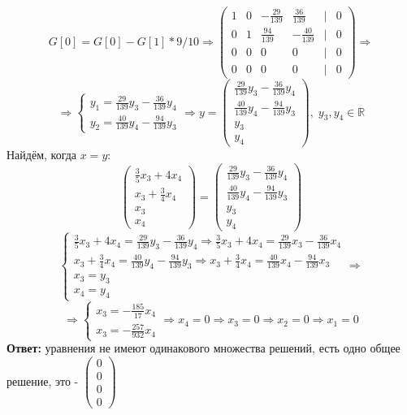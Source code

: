 \documentclass[a4paper]{article}
\newcommand{\mat}[1]{\begin{pmatrix} #1 \end{pmatrix}}
\renewcommand{\f}[2]{\frac{#1}{#2}}
\newcommand{\case}[1]{\begin{cases} #1 \end{cases}}
\renewcommand{\r}{\Rightarrow}
\newcommand{\RR}{\mathbb{R}}
\begin{document}
\begin{enumerate}
    $$G[0] = G[0]-G[1]*9/10 \r \mat{1 & 0 & -\frac{29}{139} & \frac{36}{139} & | & 0 \\ 0 & 1 & \frac{94}{139} & -\frac{40}{139} & | & 0 \\ 0 & 0 & 0 & 0 & | & 0 \\ 0 & 0 & 0 & 0 & | & 0}\r$$
    $$\r \case{y_1 = \frac{29}{139}y_3 -\frac{36}{139}y_4 \\ y_2 = \frac{40}{139}y_4-\frac{94}{139}y_3} \r y = \mat{\frac{29}{139}y_3 -\frac{36}{139}y_4 \\ \frac{40}{139}y_4-\frac{94}{139}y_3 \\ y_3 \\ y_4}, \; y_3, y_4 \in \RR$$
    Найдём, когда $x=y$:
    $$\mat{\f{3}{5}x_3 + 4x_4 \\ x_3+\f{3}{4}x_4 \\ x_3 \\ x_4} = \mat{\frac{29}{139}y_3 -\frac{36}{139}y_4 \\ \frac{40}{139}y_4-\frac{94}{139}y_3 \\ y_3 \\ y_4}$$
    $$\case{
        \f{3}{5}x_3 + 4x_4 = \frac{29}{139}y_3 -\frac{36}{139}y_4 \r \f{3}{5}x_3 + 4x_4 = \frac{29}{139}x_3 -\frac{36}{139}x_4\\ 
        x_3+\f{3}{4}x_4 = \frac{40}{139}y_4-\frac{94}{139}y_3 \r x_3+\f{3}{4}x_4 = \frac{40}{139}x_4-\frac{94}{139}x_3\\
        x_3 = y_3\\
        x_4 = y_4
    } \r$$
    $$\r \case{
        x_3 = -\f{185}{17}x_4\\
        x_3 = -\f{257}{932}x_4
    }\r x_4 = 0 \r x_3 = 0 \r x_2 =0 \r x_1 = 0$$
    \textbf{Ответ: } уравнения не имеют одинакового множества решений, есть одно общее решение, это - {\small$\mat{0\\0\\0\\0}$}
\end{enumerate}
\end{document}
